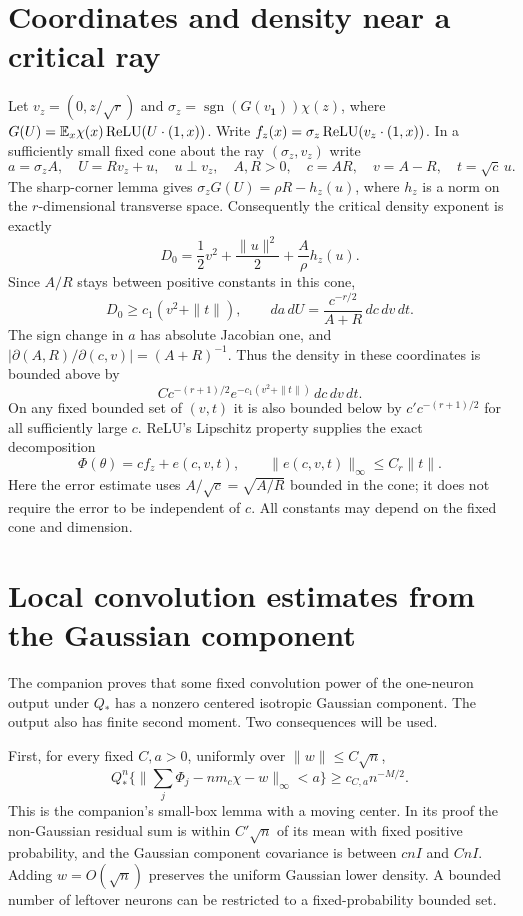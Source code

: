 \documentclass[11pt]{article}
\newcommand{\E}{\mathbb E}\newcommand{\Pp}{\mathbb P}
\newcommand{\one}{\mathbf1}
\begin{document}
\section{Coordinates and density near a critical ray}
Let $v_z=(0,z/\sqrt r)$ and
$\sigma_z=\operatorname{sgn}(G(v_{\one}))\chi(z)$, where
$G(U)=\E_x\chi(x)\relu(U\cdot(1,x))$.
Write $f_z(x)=\sigma_z\operatorname{ReLU}(v_z\cdot(1,x))$.
In a sufficiently small fixed cone about the ray
$(\sigma_z,v_z)$ write
\[
 a=\sigma_z A,\quad U=Rv_z+u,\quad u\perp v_z,\quad
 A,R>0,\quad c=AR,\quad v=A-R,\quad t=\sqrt c\,u.
\]
The sharp-corner lemma gives
$\sigma_zG(U)=\rho R-h_z(u)$, where $h_z$ is a norm on the
$r$-dimensional transverse space. Consequently the critical density
exponent is exactly
\[
 D_0=\frac12v^2+\frac{\|u\|^2}{2}+\frac A\rho h_z(u).
\]
Since $A/R$ stays between positive constants in this cone,
\[
 D_0\ge c_1(v^2+\|t\|),\qquad
 da\,dU=\frac{c^{-r/2}}{A+R}\,dc\,dv\,dt.
\]
The sign change in $a$ has absolute Jacobian one, and
$|\partial(A,R)/\partial(c,v)|=(A+R)^{-1}$.
Thus the density in these coordinates is bounded above by
\[
 C c^{-(r+1)/2}e^{-c_1(v^2+\|t\|)}\,dc\,dv\,dt.          \tag{3}
\]
On any fixed bounded set of $(v,t)$ it is also bounded below by
$c'c^{-(r+1)/2}$ for all sufficiently large $c$.
ReLU's Lipschitz property supplies the exact decomposition
\[
 \Phi(\theta)=c f_z+e(c,v,t),\qquad
 \|e(c,v,t)\|_\infty\le C_r\|t\|.                       \tag{4}
\]
Here the error estimate uses $A/\sqrt c=\sqrt{A/R}$ bounded in the
cone; it does not require the error to be independent of $c$.
All constants may depend on the fixed cone and dimension.

\section{Local convolution estimates from the Gaussian component}
The companion proves that some fixed convolution power of the
one-neuron output under $Q_*$ has a nonzero centered isotropic Gaussian
component. The output also has finite second moment. Two consequences
will be used.

First, for every fixed $C,a>0$, uniformly over $\|w\|\le C\sqrt n$,
\[
 Q_*^n\{\|\textstyle\sum_j\Phi_j-nm_c\chi-w\|_\infty<a\}
       \ge c_{C,a}n^{-M/2}.                              \tag{5}
\]
This is the companion's small-box lemma with a moving center. In its
proof the non-Gaussian residual sum is within $C'\sqrt n$ of its mean
with fixed positive probability, and the Gaussian component covariance
is between $c n I$ and $C n I$. Adding $w=O(\sqrt n)$ preserves the
uniform Gaussian lower density. A bounded number of leftover neurons
can be restricted to a fixed-probability bounded set.
\end{document}
